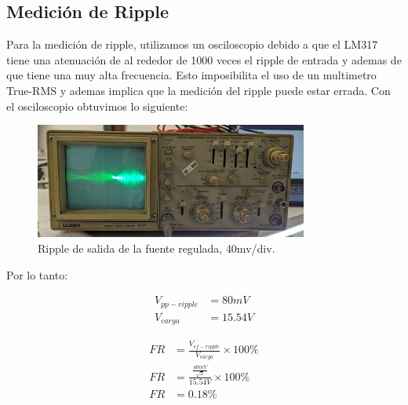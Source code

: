 \documentclass[chaptersright]{informeutn}
\begin{document}
      \subsection{Medición de Ripple}
        Para la medición de ripple, utilizamos un osciloscopio debido a que el LM317 tiene una atenuación de al
        rededor de 1000 veces el ripple de entrada y ademas de que tiene una muy alta frecuencia. Esto imposibilita el
        uso de un multimetro True-RMS y ademas implica que la medición del ripple puede estar errada. Con el
        osciloscopio obtuvimos lo siguiente:
        \begin{figure}[H]
          \centering
          \includegraphics[width=0.8\textwidth]{pictures/reg_osc-ripp.jpg}
          \caption{Ripple de salida de la fuente regulada, 40mv/div.}
        \end{figure}

        Por lo tanto:
        \begin{figure}[!h]
          \centering
          \begin{minipage}{0.4\textwidth}
            \begin{align*}
              V_{pp-ripple} &= 80mV\\[6pt]
              V_{carga} &= 15.54V
            \end{align*}
          \end{minipage}
          \begin{minipage}{0.4\textwidth}
            \begin{align*}
              FR &= \frac{V_{ef-ripple}}{V_{carga}} \times 100\%\\[6pt]
              FR &= \frac{\frac{40mV}{\sqrt{2}}}{15.54V} \times 100\%\\[6pt]
              FR &= 0.18\%
            \end{align*}
          \end{minipage}
        \end{figure}
\end{document}
